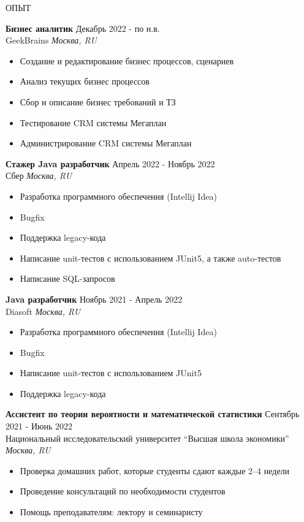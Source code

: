 \documentclass{resume}
\begin{document}
\begin{rSection}{ОПЫТ}

\textbf{Бизнес аналитик} \hfill Декабрь 2022 - по н.в.\\
GeekBrains \hfill \textit{Москва, RU}
 \begin{itemize}
    \itemsep -3pt {} 
     \item Создание и редактирование бизнес процессов, сценариев
     \item Анализ текущих бизнес процессов
     \item Сбор и описание бизнес требований и ТЗ
     \item Тестирование CRM системы Мегаплан
     \item Администрирование CRM системы Мегаплан
 \end{itemize}
 
\textbf{Стажер Java разработчик} \hfill Апрель 2022 - Ноябрь 2022\\
Сбер \hfill \textit{Москва, RU}
 \begin{itemize}
    \itemsep -3pt {} 
     \item Разработка программного обеспечения (Intellij Idea)
     \item Bugfix
     \item Поддержка legacy-кода 
     \item Написание unit-тестов с использованием JUnit5, а также auto-тестов
     \item Написание SQL-запросов

 \end{itemize}

 \textbf{Java разработчик} \hfill Ноябрь 2021 - Апрель 2022\\
Diasoft \hfill \textit{Москва, RU}
 \begin{itemize}
    \itemsep -3pt {} 
     \item Разработка программного обеспечения (Intellij Idea)
     \item Bugfix
     \item Написание unit-тестов с использованием JUnit5
     \item Поддержка legacy-кода 
 \end{itemize}

   \textbf{Ассистент по теории вероятности и математической статистики} \hfill Сентябрь 2021 - Июнь 2022\\
Национальный исследовательский университет “Высшая школа экономики” \hfill \textit{Москва, RU}
 \begin{itemize}
    \itemsep -3pt {} 
     \item Проверка домашних работ, которые студенты сдают каждые 2–4 недели
     \item Проведение консультаций по необходимости студентов
     \item Помощь преподавателям: лектору и семинаристу 
 \end{itemize}

\end{rSection} 
\end{document}
